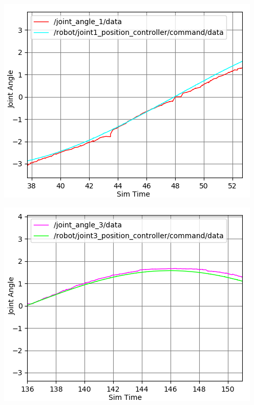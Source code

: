 \documentclass[11pt]{article}
\begin{document}
\begin{center}
\begin{minipage}{0.33\linewidth}
\includegraphics[width=\linewidth]{fig_with_axisname/2.2-joint1.png}
\end{minipage}%
\hfill
\begin{minipage}{0.33\linewidth}
\includegraphics[width=\linewidth]{fig_with_axisname/2.2-joint3.png}
\end{minipage}
\hfill
\begin{minipage}{0.33\linewidth}

\end{minipage}
\end{center}
\end{document}
